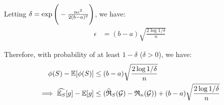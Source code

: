 \begin{solution*}
    \noindent Letting $\delta = \exp\Bigg( -\frac{n\epsilon^2}{2(b-a)^2} \Bigg)$, we have:
    \begin{align*}
        \epsilon &= (b-a)\sqrt{
            \frac{2\log 1/\delta}{n}
        }
    \end{align*}

    \noindent Therefore, with probability of at least $1-\delta$ ($\delta>0$), we have:
    \begin{align*}
        \phi(S) - \mathbb{E}[\phi(S)] &\le (b-a)\sqrt{
            \frac{2\log 1/\delta}{n}
        } \\
        \implies
        \widehat{\mathbb{E}_S}[g] - \mathbb{E}[g] &\le (\widehat{\mathfrak{R}}_S(\mathcal{G}) - \mathfrak{R}_n(\mathcal{G})) + (b-a)\sqrt{
            \frac{2\log 1/\delta}{n}
        }
    \end{align*}
\end{solution*}


